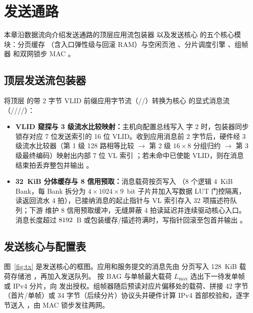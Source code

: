 \chapter{发送通路}\label{ch:tx}

本章沿数据流向介绍发送通路的顶层应用流包装器  以及发送核心  的五个核心模块：分页缓存 （含入口弹性级与回滚 RAM）与空闲页池 、分片调度引擎 、组帧器  和双网锁步 MAC 。

\section{顶层发送流包装器}\label{sec:apptx}

 将顶层  的带 2 字节 VLID 前缀应用字节流（//）转换为核心  的显式消息流（////）：
\begin{itemize}[leftmargin=2em,itemsep=1pt]
  \item \textbf{VLID 窥探与 3 级流水比较映射：}主机向配置总线写入  字 2 时，包装器同步锁存对应 7 位发送索引的 16 位 VLID。收到应用消息前 2 字节后，硬件经 3 级流水比较器（第 1 级 128 路相等比较 $\rightarrow$ 第 2 级 $16\times 8$ 分组归约 $\rightarrow$ 第 3 级最终编码）映射出内部 7 位 VL 索引 ；若未命中已使能 VLID，则在消息结束拍丢弃整包并输出 。
  \item \textbf{32~KiB 分体缓存与 8 信用预取：}消息载荷按页写入 （8 个逻辑 4~KiB Bank，每 Bank 拆分为 $4\times 1024\times 9$~bit 子片并加入写数据 LUT 门控隔离，读返回流水 4 拍），已接纳消息的起止指针与 VL 索引存入 32 项描述符队列；下游  维护 8 信用预取缓冲，无缝屏蔽 4 拍读延迟并连续驱动核心入口。消息长度超过 $8192$~B 或包装缓存/描述符满时，写指针回滚至包首并输出 。
\end{itemize}

\section{发送核心与配置表}\label{sec:txtables}

图~\ref{fig:tx} 是发送核心的框图。应用和服务提交的消息先由  分页写入 128~KiB 载荷存储池 ，再加入发送队列。 按 BAG 与单帧最大载荷 $L_\text{max}$ 选出下一待发单帧或 IPv4 分片，向  发出授权。组帧器随后预读对应片偏移处的载荷、拼接 42 字节（首片/单帧）或 34 字节（后续分片）协议头并硬件计算 IPv4 首部校验和，逐字节送入 ，由 MAC 锁步发往两网。

